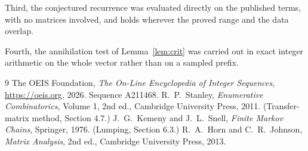 \documentclass[11pt,a4paper]{article}
\theoremstyle{plain}
\theoremstyle{definition}
\begin{document}
Third, the conjectured recurrence was evaluated directly on the published terms, with no
matrices involved, and holds wherever the proved range and the data overlap.

Fourth, the annihilation test of Lemma~\ref{lem:crit} was carried out in exact integer
arithmetic on the whole vector rather than on a sampled prefix.

\begin{thebibliography}{9}
 The OEIS Foundation, \emph{The On-Line Encyclopedia of Integer
Sequences}, \url{https://oeis.org}, 2026. Sequence A211468.
 R.~P.~Stanley, \emph{Enumerative Combinatorics}, Volume 1, 2nd ed.,
Cambridge University Press, 2011. (Transfer-matrix method, Section 4.7.)
 J.~G.~Kemeny and J.~L.~Snell, \emph{Finite Markov Chains}, Springer, 1976.
(Lumping, Section 6.3.)
 R.~A.~Horn and C.~R.~Johnson, \emph{Matrix Analysis}, 2nd ed., Cambridge
University Press, 2013.
\end{thebibliography}
\end{document}
